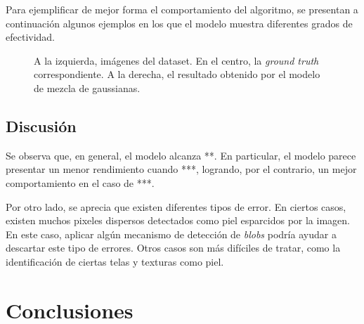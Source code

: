 \documentclass[12pt]{article}
\begin{document}
Para ejemplificar de mejor forma el comportamiento del algoritmo, se presentan a
continuación algunos ejemplos en los que el modelo muestra diferentes grados de
efectividad.

\begin{figure}[h]
    \centering
    \caption{A la izquierda, imágenes del dataset. En el centro, la \emph{ground
    truth} correspondiente. A la derecha, el resultado obtenido por el modelo de
    mezcla de gaussianas.}
\end{figure}

\subsection{Discusión}

Se observa que, en general, el modelo alcanza **. En particular, el modelo
parece presentar un menor rendimiento cuando ***, logrando, por el contrario, un
mejor comportamiento en el caso de ***. 

Por otro lado, se aprecia que existen diferentes tipos de error. En ciertos
casos, existen muchos pixeles dispersos detectados como piel esparcidos por la
imagen. En este caso, aplicar algún mecanismo de detección de
\emph{blobs} podría ayudar a descartar este tipo de errores. Otros casos son más
difíciles de tratar, como la identificación de ciertas telas y texturas como
piel.

\section{Conclusiones}





\end{document}
